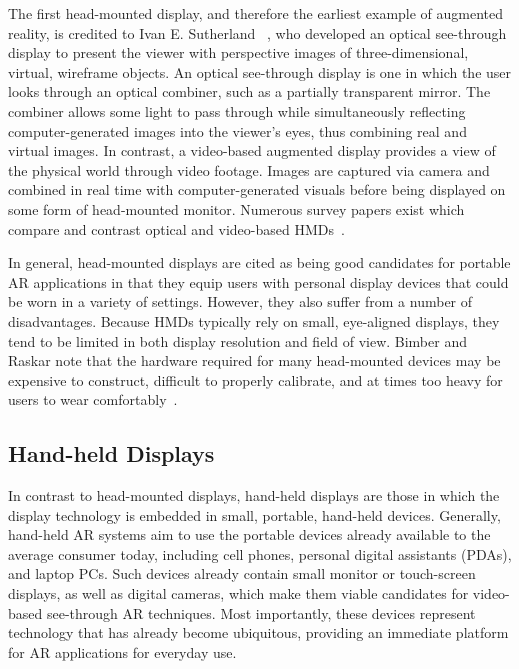 \documentclass{thesis}
\begin{document}
The first head-mounted display, and therefore the earliest example of augmented reality, is credited to Ivan E. Sutherland ~\cite{Sutherland1968}, who developed an optical see-through display to present the viewer with perspective images of three-dimensional, virtual, wireframe objects. An optical see-through display is one in which the user looks through an optical combiner, such as a partially transparent mirror. The combiner allows some light to pass through while simultaneously reflecting computer-generated images into the viewer's eyes, thus combining real and virtual images. In contrast, a video-based augmented display provides a view of the physical world through video footage. Images are captured via camera and combined in real time with computer-generated visuals before being displayed on some form of head-mounted monitor. Numerous survey papers exist which compare and contrast optical and video-based HMDs~\cite{Rolland1994, Azuma1997}.

In general, head-mounted displays are cited as being good candidates for portable AR applications in that they equip users with personal display devices that could be worn in a variety of settings. However, they also suffer from a number of disadvantages. Because HMDs typically rely on small, eye-aligned displays, they tend to be limited in both display resolution and field of view. Bimber and Raskar note that the hardware required for many head-mounted devices may be expensive to construct, difficult to properly calibrate, and at times too heavy for users to wear comfortably~\cite{BimberBook}.

\subsection{Hand-held Displays}

In contrast to head-mounted displays, hand-held displays are those in which the display technology is embedded in small, portable, hand-held devices. Generally, hand-held AR systems aim to use the portable devices already available to the average consumer today, including cell phones, personal digital assistants (PDAs), and laptop PCs. Such devices already contain small monitor or touch-screen displays, as well as digital cameras, which make them viable candidates for video-based see-through AR techniques. Most importantly, these devices represent technology that has already become ubiquitous, providing an immediate platform for AR applications for everyday use.
\end{document}
